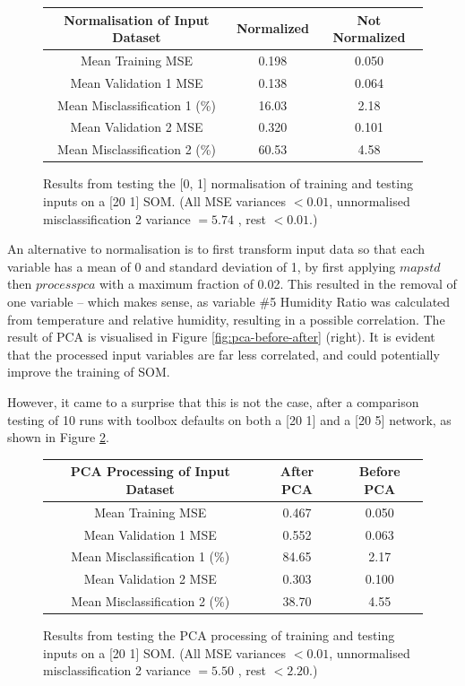\documentclass[10pt, oneside]{article}
\begin{document}
\begin{figure}[h]
\begin{center}
\fontsize{9}{11}\selectfont
\begin{tabular}{|c|c|c|}
\hline 
Normalisation of Input Dataset & Normalized & Not Normalized \\ \hline
Mean Training MSE & 0.198 & 0.050 \\ \hline \hline 
Mean Validation 1 MSE & 0.138 & 0.064 \\ \hline 
Mean Misclassification 1 (\%) & 16.03 & 2.18 \\ \hline \hline 
Mean Validation 2 MSE & 0.320 & 0.101 \\ \hline 
Mean Misclassification 2 (\%) & 60.53 & 4.58 \\ \hline
\end{tabular}
\end{center}
\caption{\label{fig:normalize-testing} Results from testing the [0, 1] normalisation of training and testing inputs on a [20 1] SOM. (All MSE variances $<0.01$, unnormalised misclassification 2 variance $=5.74$ , rest $<0.01$.)}
\end{figure}

An alternative to normalisation is to first transform input data so that each variable has a mean of 0 and standard deviation of 1, by first applying $mapstd$ then $processpca$ with a maximum fraction of 0.02. This resulted in the removal of one variable -- which makes sense, as variable \#5 Humidity Ratio was calculated from temperature and relative humidity, resulting in a possible correlation. The result of PCA is visualised in Figure \ref{fig:pca-before-after} (right). It is evident that the processed input variables are far less correlated, and could potentially improve the training of SOM.

However, it came to a surprise that this is not the case, after a comparison testing of 10 runs with toolbox defaults on both a [20 1] and a [20 5] network, as shown in Figure \ref{fig:pca-testing}.

\begin{figure}[h]
\begin{center}
\fontsize{9}{11}\selectfont
\begin{tabular}{|c|c|c|}
\hline 
PCA Processing of Input Dataset & After PCA & Before PCA \\ \hline
Mean Training MSE & 0.467 & 0.050 \\ \hline \hline 
Mean Validation 1 MSE & 0.552 & 0.063 \\ \hline 
Mean Misclassification 1 (\%) & 84.65 & 2.17 \\ \hline \hline 
Mean Validation 2 MSE & 0.303 & 0.100 \\ \hline 
Mean Misclassification 2 (\%) & 38.70 & 4.55 \\ \hline
\end{tabular}
\end{center}
\caption{\label{fig:pca-testing} Results from testing the PCA processing of training and testing inputs on a [20 1] SOM. (All MSE variances $<0.01$, unnormalised misclassification 2 variance $=5.50$ , rest $<2.20$.)}
\end{figure}
\end{document}
